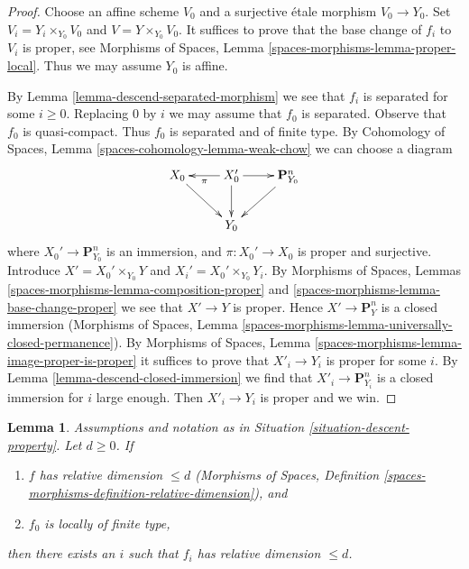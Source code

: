 \documentclass{stacks-project}
\theoremstyle{plain}
\newtheorem{lemma}[subsection]{Lemma}
\theoremstyle{definition}
\theoremstyle{remark}
\numberwithin{equation}{subsection}
\begin{document}
\begin{proof}
Choose an affine scheme $V_0$ and a surjective \'etale morphism $V_0 \to Y_0$.
Set $V_i = Y_i \times_{Y_0} V_0$ and $V = Y \times_{Y_0} V_0$.
It suffices to prove that the base change of $f_i$ to $V_i$ is
proper, see Morphisms of Spaces, Lemma
\ref{spaces-morphisms-lemma-proper-local}.
Thus we may assume $Y_0$ is affine.

\medskip\noindent
By Lemma \ref{lemma-descend-separated-morphism} we see that
$f_i$ is separated for some $i \geq 0$. Replacing
$0$ by $i$ we may assume that $f_0$ is separated.
Observe that $f_0$ is quasi-compact. Thus $f_0$ is separated and
of finite type. By
Cohomology of Spaces, Lemma \ref{spaces-cohomology-lemma-weak-chow}
we can choose a diagram
$$
\xymatrix{
X_0 \ar[rd] & X_0' \ar[d] \ar[l]^\pi \ar[r] & \mathbf{P}^n_{Y_0} \ar[dl] \\
& Y_0 &
}
$$
where $X_0' \to \mathbf{P}^n_{Y_0}$ is an immersion, and
$\pi : X_0' \to X_0$ is proper and surjective. Introduce
$X' = X_0' \times_{Y_0} Y$ and $X_i' = X_0' \times_{Y_0} Y_i$.
By Morphisms of Spaces, Lemmas
\ref{spaces-morphisms-lemma-composition-proper} and
\ref{spaces-morphisms-lemma-base-change-proper}
we see that $X' \to Y$ is proper. Hence $X' \to \mathbf{P}^n_Y$ is
a closed immersion (Morphisms of Spaces, Lemma
\ref{spaces-morphisms-lemma-universally-closed-permanence}). By
Morphisms of Spaces, Lemma \ref{spaces-morphisms-lemma-image-proper-is-proper}
it suffices to prove that $X'_i \to Y_i$ is proper for some $i$.
By Lemma \ref{lemma-descend-closed-immersion}
we find that $X'_i \to \mathbf{P}^n_{Y_i}$ is
a closed immersion for $i$ large enough. Then $X'_i \to Y_i$
is proper and we win.
\end{proof}

\begin{lemma}
\label{lemma-eventually-relative-dimension}
Assumptions and notation as in Situation \ref{situation-descent-property}.
Let $d \geq 0$. If
\begin{enumerate}
\item $f$ has relative dimension $\leq d$
(Morphisms of Spaces, Definition
\ref{spaces-morphisms-definition-relative-dimension}), and
\item $f_0$ is locally of finite type,
\end{enumerate}
then there exists an $i$ such that $f_i$ has relative dimension $\leq d$.
\end{lemma}
\end{document}
